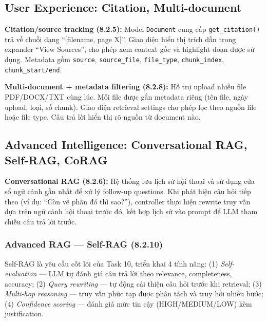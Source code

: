 \documentclass[10pt, conference, a4paper, compsocconf]{IEEEtran}
\begin{document}
\subsection{User Experience: Citation, Multi-document}

\textbf{Citation/source tracking (8.2.5):} Model \texttt{Document} cung cấp \texttt{get\_citation()} trả về chuỗi dạng ``[filename, page X]''. Giao diện hiển thị trích dẫn trong expander ``View Sources'', cho phép xem context gốc và highlight đoạn được sử dụng. Metadata gồm \texttt{source}, \texttt{source\_file}, \texttt{file\_type}, \texttt{chunk\_index}, \texttt{chunk\_start/end}.

\textbf{Multi-document + metadata filtering (8.2.8):} Hỗ trợ upload nhiều file PDF/DOCX/TXT cùng lúc. Mỗi file được gắn metadata riêng (tên file, ngày upload, loại, số chunk). Giao diện retrieval settings cho phép lọc theo nguồn file hoặc file type. Câu trả lời hiển thị rõ nguồn từ document nào.

\subsection{Advanced Intelligence: Conversational RAG, Self-RAG, CoRAG}

\textbf{Conversational RAG (8.2.6):} Hệ thống lưu lịch sử hội thoại và sử dụng cửa sổ ngữ cảnh gần nhất để xử lý follow-up questions. Khi phát hiện câu hỏi tiếp theo (ví dụ: ``Còn về phần đó thì sao?''), controller thực hiện rewrite truy vấn dựa trên ngữ cảnh hội thoại trước đó, kết hợp lịch sử vào prompt để LLM tham chiếu câu trả lời trước.

\subsubsection{Advanced RAG --- Self-RAG (8.2.10)}

Self-RAG là yêu cầu cốt lõi của Task 10, triển khai 4 tính năng: (1) \textit{Self-evaluation} --- LLM tự đánh giá câu trả lời theo relevance, completeness, accuracy; (2) \textit{Query rewriting} --- tự động cải thiện câu hỏi trước khi retrieval; (3) \textit{Multi-hop reasoning} --- truy vấn phức tạp được phân tách và truy hồi nhiều bước; (4) \textit{Confidence scoring} --- đánh giá mức tin cậy (HIGH/MEDIUM/LOW) kèm justification.
\end{document}
